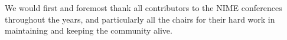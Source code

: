 %
%



We would first and foremost thank all contributors to the NIME conferences throughout the years, and particularly all the chairs for their hard work in maintaining and keeping the community alive.

